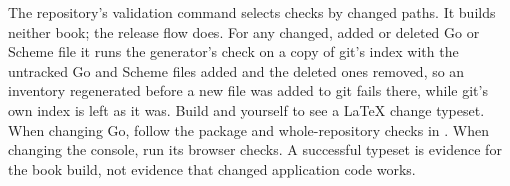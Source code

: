 The repository's validation command selects checks by changed paths. It
builds neither book; the release flow does. For any changed, added or
deleted Go or Scheme file it runs the generator's check on a copy of git's
index with the untracked Go and Scheme files added and the deleted ones
removed, so an inventory regenerated before a new file was added to git
fails there, while git's own index is left as it was. Build
 and  yourself to see a LaTeX change
typeset. When changing Go, follow
the package and whole-repository checks in . When changing
the console, run its browser checks. A successful typeset is evidence for
the book build, not evidence that changed application code works.

